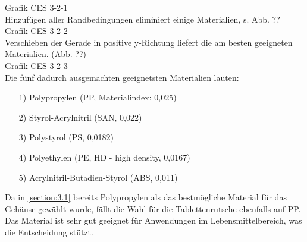 Grafik CES 3-2-1\\
Hinzufügen aller Randbedingungen eliminiert einige Materialien, s. Abb. ??\\
Grafik CES 3-2-2\\
Verschieben der Gerade in positive y-Richtung liefert die am besten geeigneten Materialien. (Abb. ??)\\
Grafik CES 3-2-3\\
Die fünf dadurch ausgemachten geeignetsten Materialien lauten:
\begin{itemize}
	\item[1)] Polypropylen (PP, Materialindex: 0,025)
	\item[2)] Styrol-Acrylnitril (SAN, 0,022) 
	\item[3)] Polystyrol (PS, 0,0182)
	\item[4)] Polyethylen (PE, HD - high density, 0,0167)
	\item[5)] Acrylnitril-Butadien-Styrol (ABS, 0,011)
\end{itemize}
Da in \ref{section:3.1} bereits Polypropylen als das bestmögliche Material für das Gehäuse gewählt wurde, fällt die Wahl für die Tablettenrutsche ebenfalls auf PP. Das Material ist sehr gut geeignet für Anwendungen im Lebensmittelbereich, was die Entscheidung stützt.

